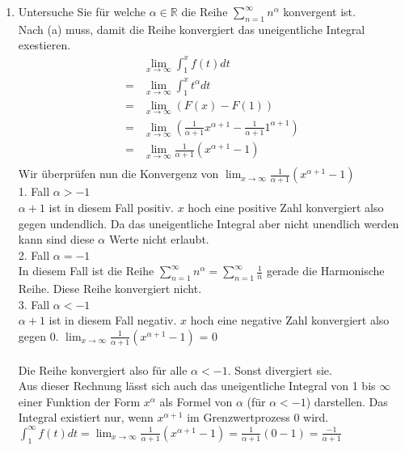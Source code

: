 \documentclass{article}
\begin{document}
\begin{enumerate}[ label = (\alph*) ]
        \item Untersuche Sie für welche \(\alpha \in \mathbb{R}\) die Reihe \(\sum_{n=1}^\infty n^{\alpha} \) konvergent ist. \\
        Nach (a) muss, damit die Reihe konvergiert das uneigentliche Integral exestieren.
        \begin{align*}
            &\lim_{x \to \infty} \int_1^{x} f(t) dt \\
            = &\lim_{x \to \infty} \int_1^{x} t^{\alpha} dt \\
            = &\lim_{x \to \infty} (F(x) - F(1)) \\
            = &\lim_{x \to \infty} (\frac{1}{\alpha + 1} x^{\alpha + 1} - \frac{1}{\alpha + 1} 1^{\alpha + 1}) \\
            = &\lim_{x \to \infty} \frac{1}{\alpha + 1} (x^{\alpha + 1} - 1) \\
        \end{align*}
        Wir überprüfen nun die Konvergenz von \(\lim_{x \to \infty} \frac{1}{\alpha + 1} (x^{\alpha + 1} - 1) \) \\
        1. Fall \(\alpha > -1\) \\
        \(\alpha + 1\) ist in diesem Fall positiv. \(x\) hoch eine positive Zahl konvergiert also gegen undendlich.
        Da das uneigentliche Integral aber nicht unendlich werden kann sind diese \(\alpha\) Werte nicht erlaubt. \\
        2. Fall \(\alpha = -1\) \\
        In diesem Fall ist die Reihe \(\sum_{n=1}^{\infty} n^{\alpha} = \sum_{n=1}^{\infty} \frac{1}{n}\) gerade die Harmonische Reihe.
        Diese Reihe konvergiert nicht. \\
        3. Fall \(\alpha < -1\) \\
        \(\alpha + 1\) ist in diesem Fall negativ. \(x\) hoch eine negative Zahl konvergiert also gegen 0.
        \(\lim_{x \to \infty} \frac{1}{\alpha + 1} (x^{\alpha + 1} - 1) \) = 0 \\\\
        Die Reihe konvergiert also für alle \(\alpha < -1 \). Sonst divergiert sie. \\
        Aus dieser Rechnung lässt sich auch das uneigentliche Integral von 1 bis \(\infty\) einer Funktion der Form \(x^{\alpha}\) als Formel von \(\alpha\) (für \(\alpha < -1\)) darstellen.
        Das Integral existiert nur, wenn \(x^{\alpha + 1}\) im Grenzwertprozess 0 wird.
        \(\int_1^{\infty} f(t) dt = \lim_{x \to \infty} \frac{1}{\alpha + 1} (x^{\alpha + 1} - 1) = \frac{1}{\alpha + 1} (0 - 1) = \frac{-1}{\alpha + 1}\)

    \end{enumerate}
\end{document}
